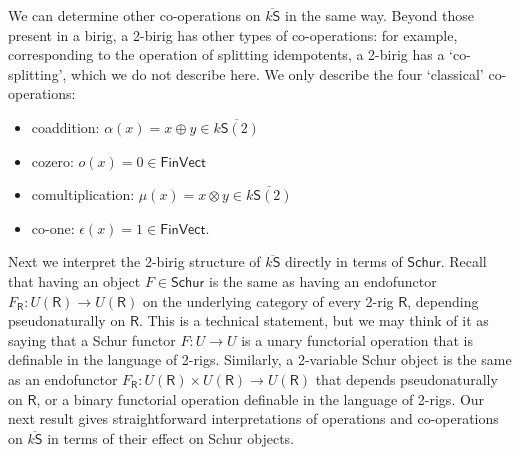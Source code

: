 \documentclass[12pt,reqno]{amsart}
\theoremstyle{plain}
\theoremstyle{definition}
\theoremstyle{remark}
\newcommand{\maps}{\colon}
\newcommand{\category}[1]{\mathsf{#1}}
\newcommand{\R}{\category R}
\renewcommand{\S}{\category S}
\newcommand{\namedcat}[1]{\mathsf{#1}}
\newcommand{\Schur}{\namedcat{Schur}}
\newcommand{\Vect}{\namedcat{Vect}}
\newcommand{\Fin}{\namedcat{Fin}}
\newcommand{\ksbar}{\overline{k\S}}
\numberwithin{thm}{section}
\begin{document}
We can determine other co-operations on $\ksbar$ in the same way. Beyond those present in a birig, a 2-birig has other types of co-operations: for example, corresponding to the operation of splitting idempotents, a 2-birig has a `co-splitting', which we do not describe here. We only describe the four `classical' co-operations:
\begin{itemize}
    \item coaddition: $\alpha(x) = x \oplus y \in \overline{k\S(2)}$
    \item cozero: $o(x) = 0 \in \Fin\Vect$
    \item comultiplication: $\mu(x) = x \otimes y \in \overline{k\S(2)}$
    \item co-one: $\epsilon(x) = 1 \in \Fin\Vect$.
\end{itemize}

Next we interpret the 2-birig structure of $\ksbar$ directly in terms of $\Schur$. Recall that having an object $F \in \Schur$ is the same as having an endofunctor $F_\R \maps U(\R) \to U(\R)$ on the underlying category of every 2-rig $\R$, depending pseudonaturally on $\R$. This is a technical statement, but we may think of it as saying that a Schur functor $F \maps U \to U$ is a unary functorial operation that is definable in the language of 2-rigs. Similarly, a 2-variable Schur object is the same as an endofunctor $F_\R \maps U(\R) \times U(\R) \to U(\R)$ that depends pseudonaturally on $\R$, or a binary functorial operation definable in the language of 2-rigs. Our next result gives straightforward interpretations of operations and co-operations on $\overline{k \S}$ in terms of their effect on Schur objects.
\end{document}
